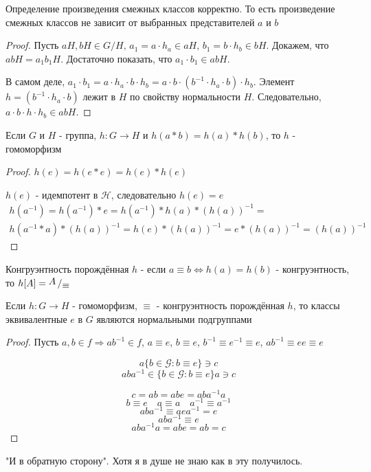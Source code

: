 \documentclass[../main/document.tex]{subfiles}
\begin{document}
\begin{thm}
Определение произведения смежных классов корректно. То есть произведение смежных классов не зависит от выбранных представителей $a$ и $b$
\begin{proof}
Пусть $aH,bH\in G/H,\,a_1=a\cdot h_a\in aH,\,b_1=b\cdot h_b\in bH$. Докажем, что $abH=a_1 b_1 H$. Достаточно показать, что $a_1\cdot b_1 \in abH$.

В самом деле, $a_1\cdot b_1=a\cdot h_a\cdot b\cdot h_b=a\cdot b\cdot (b^{-1}\cdot h_a\cdot b)\cdot h_b$. Элемент $h = (b^{-1}\cdot h_a\cdot b)$ лежит в $H$ по свойству нормальности $H$. Следовательно, $a\cdot b\cdot h\cdot h_b\in abH$.
\end{proof}
\end{thm}

\begin{thm}
Если $G$ и $H$ - группа, $h:G\rightarrow H$ и $h(a*b)=h(a)*h(b)$, то $h$ - гомоморфизм
\begin{proof}
$h(e)=h(e*e)=h(e)*h(e)$

$h(e)$ - идемпотент в $\mathcal{H}$, следовательно $h(e)=e$
\begin{multline*}
h(a^{-1})=h(a^{-1})*e=h(a^{-1})*h(a)*(h(a))^{-1}=\\
h(a^{-1}*a)*(h(a))^{-1}=h(e)*(h(a))^{-1}=e*(h(a))^{-1}=(h(a))^{-1}
\end{multline*}
\end{proof}
\end{thm}

\begin{dfn}
Конгруэнтность порождённая $h$ - если $a\equiv b \Leftrightarrow h(a)=h(b)$ - конгруэнтность, то $h[A]= \bigslant{A}{\equiv}$ 
\end{dfn}

\begin{thm}
Если $h:G\rightarrow H$ - гомоморфизм, $\equiv$ - конгруэнтность порождённая $h$, то классы эквивалентные $e$ в $G$ являются нормальными подгруппами
\begin{proof}
Пусть $a,b\in f\Rightarrow ab^{-1}\in f$, $a\equiv e$, $b\equiv e$, $b^{-1}\equiv e^{-1}\equiv e$, $ab^{-1}\equiv ee\equiv e$

$$a\{b\in \mathcal{G}:b\equiv e\}\ni c$$
$$aba^{-1}\in\{b\in \mathcal{G}:b\equiv e\}a\ni c$$

$$c=ab=abe=aba^{-1}a$$
$$b\equiv e \quad a\equiv a\quad a^{-1}\equiv a^{-1}$$
$$aba^{-1}\equiv aea^{-1}=e$$
$$aba^{-1}\equiv e$$
$$aba^{-1}a=abe=ab=c$$
\end{proof}
"И в обратную сторону". Хотя я в душе не знаю как в эту получилось.
\end{thm}
\end{document}
